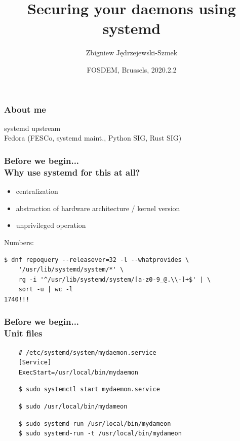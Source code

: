 \documentclass[serif]{beamer}
\title[Systemd security features]{Securing your daemons using systemd}
\author{Zbigniew Jędrzejewski-Szmek}
\institute{%
  \texttt{[image: beamer-themeredhat/redhat.png]}\\
  \medskip
  \textit{zbyszek@in.waw.pl}\\
  \medskip
  \ccbysa
}
\date{\tiny FOSDEM, Brussels, 2020.2.2}
\begin{document}
\begin{frame}
\titlepage %
\end{frame}

\begin{frame}
  \frametitle{About me}

  systemd upstream\\
  Fedora (FESCo, systemd maint., Python SIG, Rust SIG)

\end{frame}

\begin{frame}[fragile]
  \frametitle{Before we begin...\\Why use systemd for this at all?}

  \begin{itemize}
  \item centralization
  \item abstraction of hardware architecture / kernel version
  \item unprivileged operation
  \end{itemize}

  \pause
  \bigskip

  Numbers:
  \begin{verbatim}
$ dnf repoquery --releasever=32 -l --whatprovides \
    '/usr/lib/systemd/system/*' \
    rg -i '^/usr/lib/systemd/system/[a-z0-9_@.\\-]+$' | \
    sort -u | wc -l
1740!!!
  \end{verbatim}

\end{frame}

\begin{frame}[fragile]
  \frametitle{Before we begin...\\Unit files}

  \pause

  \begin{verbatim}
    # /etc/systemd/system/mydaemon.service
    [Service]
    ExecStart=/usr/local/bin/mydaemon
  \end{verbatim}
  \begin{verbatim}
    $ sudo systemctl start mydaemon.service
  \end{verbatim}

  \medskip
  \pause

  \begin{verbatim}
    $ sudo /usr/local/bin/mydameon
  \end{verbatim}

  \medskip
  \pause

  \begin{verbatim}
    $ sudo systemd-run /usr/local/bin/mydameon
    $ sudo systemd-run -t /usr/local/bin/mydameon
  \end{verbatim}
\end{frame}
\end{document}
